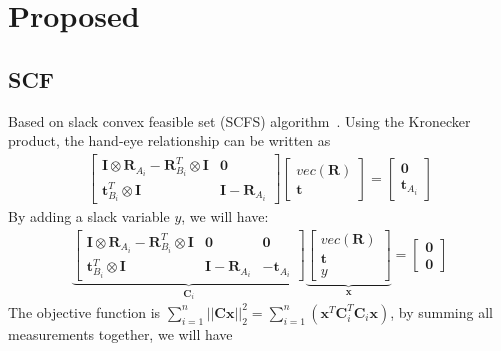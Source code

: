 \section{Proposed}
\subsection{SCF}
Based on slack convex feasible set (SCFS) algorithm~\cite{liu2017speed}. 
Using the Kronecker product, the hand-eye relationship can be written as
\begin{align}
\left[
\begin{matrix}
\mathbf{I}\otimes \mathbf{R}_{A_i} - \mathbf{R}_{B_i}^T \otimes \mathbf{I} &  \mathbf{0}\\
\mathbf{t}_{B_i}^T\otimes \mathbf{I} & \mathbf{I}-\mathbf{R}_{A_i}
\end{matrix}
\right]
\left[
\begin{matrix}
vec(\mathbf{R}) \\
\mathbf{t}
\end{matrix}
\right]=\left[
\begin{matrix}
\mathbf{0} \\
\mathbf{t}_{A_i}
\end{matrix}
\right]
\end{align}
By adding a slack variable $y$, we will have:
\begin{align}
\underbrace{
\left[
\begin{matrix}
\mathbf{I}\otimes \mathbf{R}_{A_i} - \mathbf{R}_{B_i}^T \otimes \mathbf{I} &  \mathbf{0} & \mathbf{0}\\
\mathbf{t}_{B_i}^T\otimes \mathbf{I} & \mathbf{I}-\mathbf{R}_{A_i} & -\mathbf{t}_{A_i}
\end{matrix}
\right]}_{\mathbf{C}_i}
\underbrace{
\left[
\begin{matrix}
vec(\mathbf{R}) \\
\mathbf{t} \\
y
\end{matrix}
\right]}_{\mathbf{x}}=\left[
\begin{matrix}
\mathbf{0} \\
\mathbf{0}
\end{matrix}
\right]
\end{align}
The objective function is $\sum_{i=1}^{n}||\mathbf{C}\mathbf{x}||_2^2=\sum_{i=1}^{n} \left(\mathbf{x}^T\mathbf{C}_i^T\mathbf{C}_i\mathbf{x}\right)$, by summing all measurements together, we will have
